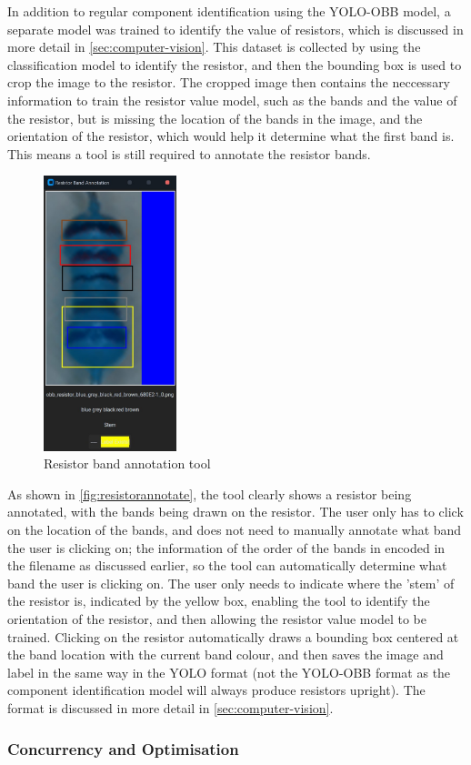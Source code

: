 In addition to regular component identification using the YOLO-OBB model, a separate model was trained to identify the value of resistors, which is discussed in more detail in \autoref{sec:computer-vision}. This dataset is collected by using the classification model to identify the resistor, and then the bounding box is used to crop the image to the resistor. The cropped image then contains the neccessary information to train the resistor value model, such as the bands and the value of the resistor, but is missing the location of the bands in the image, and the orientation of the resistor, which would help it determine what the first band is. This means a tool is still required to annotate the resistor bands.

\begin{figure}[H]
    \hfill
    \begin{minipage}[t]{\textwidth}
      \centering
      \includegraphics[height=8cm]{imgs/python/resistorannotate.jpg}
        \caption{Resistor band annotation tool}
        \label{fig:resistorannotate}
    \end{minipage}
\end{figure}

As shown in \autoref{fig:resistorannotate}, the tool clearly shows a resistor being annotated, with the bands being drawn on the resistor. The user only has to click on the location of the bands, and does not need to manually annotate what band the user is clicking on; the information of the order of the bands in encoded in the filename as discussed earlier, so the tool can automatically determine what band the user is clicking on. The user only needs to indicate where the 'stem' of the resistor is, indicated by the yellow box, enabling the tool to identify the orientation of the resistor, and then allowing the resistor value model to be trained. Clicking on the resistor automatically draws a bounding box centered at the band location with the current band colour, and then saves the image and label in the same way in the YOLO format (not the YOLO-OBB format as the component identification model will always produce resistors upright). The format is discussed in more detail in \autoref{sec:computer-vision}. 

\subsubsection{Concurrency and Optimisation}
\label{sec:concurrency}


